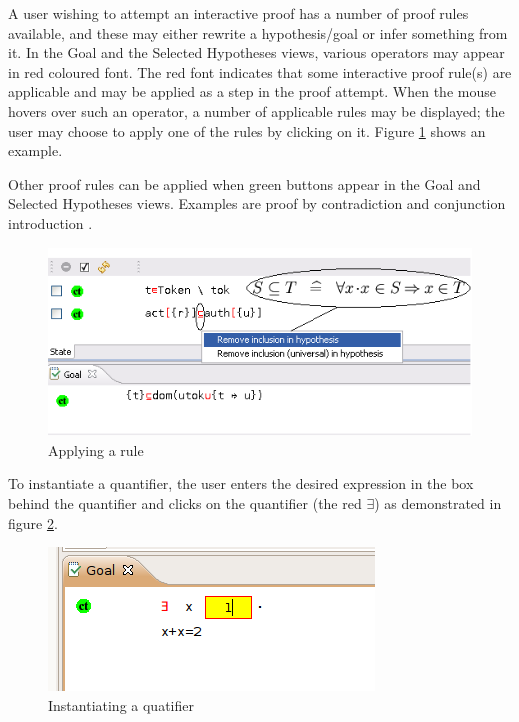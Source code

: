 A user wishing to attempt an interactive proof has a number of proof rules available, and these may either rewrite a hypothesis/goal or infer something from it. In the \textsf{Goal} and the \textsf{Selected Hypotheses} views, various operators may appear in red coloured font. The red font indicates that some interactive proof rule(s) are applicable and may be applied as a step in the proof attempt. When the mouse hovers over such an operator, a number of applicable rules may be displayed; the user may choose to apply one of the rules by clicking on it. Figure \ref{fig_ref_01_proving_perspective4} shows an example.

Other proof rules can be applied when green buttons appear in the \textsf{Goal} and \textsf{Selected Hypotheses} views. Examples are proof by contradiction  and conjunction introduction . 

\begin{figure}[!ht]
\begin{center}
	\includegraphics{img/reference/ref_01_proving_perspective4.png}
	\caption{Applying a rule}
	\label{fig_ref_01_proving_perspective4}
\end{center}
\end{figure}

To instantiate a quantifier, the user enters the desired expression in the box behind the quantifier and clicks on the quantifier (the red $\exists$) as demonstrated in figure \ref{fig_ref_01_proving_perspective5}.

\begin{figure}[!ht]
\begin{center}
	\includegraphics{img/reference/ref_01_proving_perspective5.png}
	\caption{Instantiating a quatifier}
	\label{fig_ref_01_proving_perspective5}
\end{center}
\end{figure}

